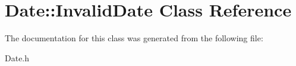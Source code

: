 \hypertarget{class_date_1_1_invalid_date}{\section{Date\+:\+:Invalid\+Date Class Reference}
\label{class_date_1_1_invalid_date}
}


The documentation for this class was generated from the following file\+:\begin{DoxyCompactItemize}
\item 
Date.\+h\end{DoxyCompactItemize}

